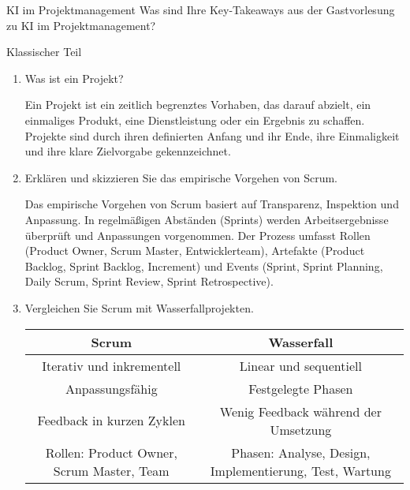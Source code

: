 \documentclass{article}
\begin{document}
\begin{exercise}{KI im Projektmanagement}
  Was sind Ihre Key-Takeaways aus der Gastvorlesung zu KI im Projektmanagement?

  \begin{solution}
  \end{solution}
\end{exercise}


\begin{exercise}{Klassischer Teil}
  \begin{enumerate}
    \item Was ist ein Projekt?

          \begin{solution}
            Ein Projekt ist ein zeitlich begrenztes Vorhaben, das darauf abzielt, ein einmaliges Produkt, eine Dienstleistung oder ein Ergebnis zu schaffen. Projekte sind durch ihren definierten Anfang und ihr Ende, ihre Einmaligkeit und ihre klare Zielvorgabe gekennzeichnet.
          \end{solution}

    \item Erklären und skizzieren Sie das empirische Vorgehen von Scrum.

          \begin{solution}
            Das empirische Vorgehen von Scrum basiert auf Transparenz, Inspektion und Anpassung. In regelmäßigen Abständen (Sprints) werden Arbeitsergebnisse überprüft und Anpassungen vorgenommen. Der Prozess umfasst Rollen (Product Owner, Scrum Master, Entwicklerteam), Artefakte (Product Backlog, Sprint Backlog, Increment) und Events (Sprint, Sprint Planning, Daily Scrum, Sprint Review, Sprint Retrospective).
          \end{solution}

    \item Vergleichen Sie Scrum mit Wasserfallprojekten.

          \begin{solution}
            \begin{tabular}{|c|c|}
              \hline
              \textbf{Scrum}                            & \textbf{Wasserfall}                                     \\
              \hline
              Iterativ und inkrementell                 & Linear und sequentiell                                  \\
              Anpassungsfähig                           & Festgelegte Phasen                                      \\
              Feedback in kurzen Zyklen                 & Wenig Feedback während der Umsetzung                    \\
              Rollen: Product Owner, Scrum Master, Team & Phasen: Analyse, Design, Implementierung, Test, Wartung \\
              \hline
            \end{tabular}
          \end{solution}


\end{enumerate}
\end{exercise}
\end{document}

